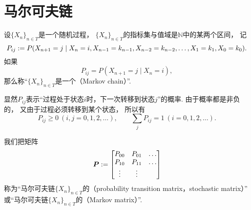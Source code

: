 \section{马尔可夫链}
\begin{definition}
设\(\{X_n\}_{n \in T}\)是一个随机过程，
\(\{X_n\}_{n \in T}\)的指标集与值域是\(\mathbb{N}\)中的某两个区间，
记\begin{equation*}
	P_{ij}
	:=
	P(
		X_{n+1} = j
		\mid
		X_n = i,
		X_{n-1} = k_{n-1},
		X_{n-2} = k_{n-2},
		\dotsc,
		X_1 = k_1,
		X_0 = k_0
	).
\end{equation*}
如果\begin{equation*}
	P_{ij}
	= P(
		X_{n+1} = j
		\mid
		X_n = i
	),
\end{equation*}
那么称“\(\{X_n\}_{n \in T}\)是一个（Markov chain）”.
\end{definition}

显然\(P_{ij}\)表示“过程处于状态\(i\)时，下一次转移到状态\(j\)”的概率.
由于概率都是非负的，
又由于过程必须转移到某个状态，
所以有\begin{equation*}
	P_{ij} \geq 0\ (i,j=0,1,2,\dotsc),
	\qquad
	\sum_j P_{ij} = 1\ (i=0,1,2,\dotsc).
\end{equation*}

我们把矩阵\begin{equation*}
	\boldsymbol{P}
	:= \begin{bmatrix}
		P_{00} & P_{01} & \dots \\
		P_{10} & P_{11} & \dots \\
		\vdots & \vdots & \\
	\end{bmatrix}
\end{equation*}
称为“马尔可夫链\(\{X_n\}_{n \in T}\)的（probability transition matrix，stochastic matrix）”
或“马尔可夫链\(\{X_n\}_{n \in T}\)的（Markov matrix）”.
